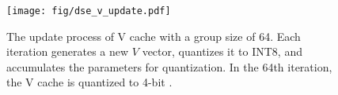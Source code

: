 \begin{figure}[t] 
    \centering 
    \texttt{[image: fig/dse\_v\_update.pdf]}  
    \caption{The update process of V cache with a group size of 64. Each iteration generates a new $V$ vector, quantizes it to INT8, and accumulates the parameters for \proj quantization. In the 64th iteration, the V cache is quantized to 4-bit \proj.}
    \label{fig:v_update}
\end{figure}